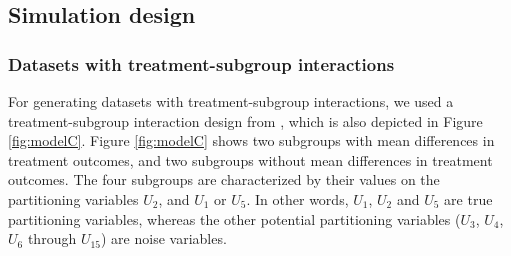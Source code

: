 \documentclass[nobf,doc]{apa}
\begin{document}
\subsection{Simulation design}

\subsubsection{Datasets with treatment-subgroup interactions}
For generating datasets with treatment-subgroup interactions, we used a treatment-subgroup interaction design from , which is also depicted in Figure \ref{fig:modelC}. Figure \ref{fig:modelC} shows two subgroups with mean differences in treatment outcomes, and two subgroups without mean differences in treatment outcomes. The four subgroups are characterized by their values on the partitioning variables $U_2$, and $U_1$ or $U_5$. In other words, $U_1$, $U_2$ and $U_5$ are true partitioning variables, whereas the other potential partitioning variables ($U_3$, $U_4$, $U_6$ through $U_{15}$) are noise variables.
\end{document}
